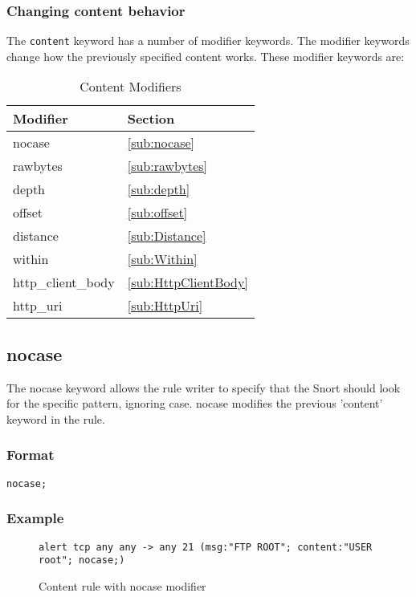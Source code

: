 \documentclass[english]{report}
\begin{document}
\subsubsection{Changing content behavior}

The \texttt{content} keyword has a number of modifier keywords.  The modifier keywords change 
how the previously specified content works.  These modifier keywords are:

\begin{center}
\begin{longtable}{|p{1in}|p{1in}|}
\caption{Content Modifiers \label{Content Modifiers}} \\
\hline 
Modifier & Section \\
\hline
\hline 
nocase & \ref{sub:nocase} \\
\hline
rawbytes & \ref{sub:rawbytes} \\
\hline
depth & \ref{sub:depth} \\
\hline 
offset & \ref{sub:offset} \\
\hline
distance & \ref{sub:Distance} \\
\hline 
within & \ref{sub:Within} \\
\hline
http\_client\_body & \ref{sub:HttpClientBody} \\
\hline 
http\_uri & \ref{sub:HttpUri} \\
\hline
\end{longtable}
\end{center}

\subsection{nocase\label{sub:nocase}}

The nocase keyword allows the rule writer to specify that the Snort should look
for the specific pattern, ignoring case.  nocase modifies the previous 'content' keyword in the rule.

\subsubsection{Format}

\begin{verbatim}
nocase;
\end{verbatim}

\subsubsection{Example}
\begin{figure}[!hbpt]
\begin{verbatim}
alert tcp any any -> any 21 (msg:"FTP ROOT"; content:"USER root"; nocase;)
\end{verbatim}

\caption{\label{content nocase mod example}Content rule with nocase modifier}
\end{figure}
\end{document}
